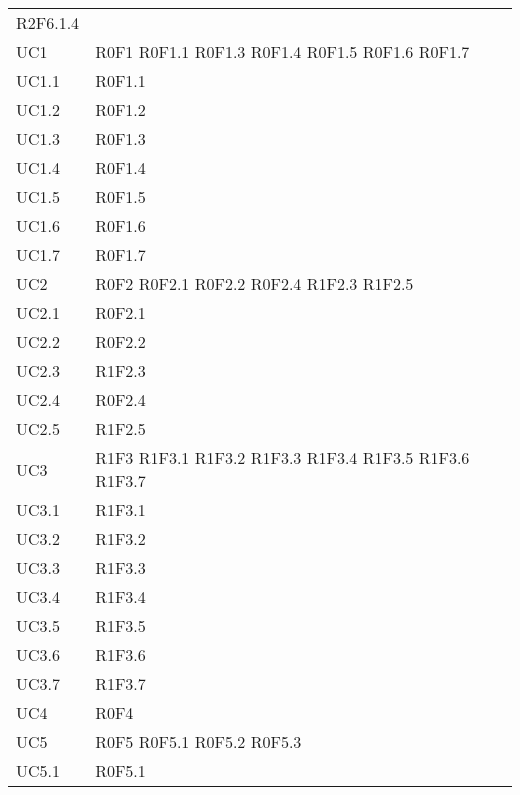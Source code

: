\begin{longtable}{p{2.5cm}!{\VRule[1pt]}p{5.5cm}}
R2F6.1.4 \\
UC1 & R0F1 
	\newline R0F1.1
	\newline R0F1.3
	\newline R0F1.4
	\newline R0F1.5
	\newline R0F1.6
	\newline R0F1.7\\
UC1.1 & R0F1.1\\
UC1.2 & R0F1.2\\
UC1.3 & R0F1.3\\
UC1.4 & R0F1.4\\
UC1.5 & R0F1.5\\
UC1.6 & R0F1.6\\
UC1.7 & R0F1.7\\
UC2 & R0F2
	\newline R0F2.1
	\newline R0F2.2
	\newline R0F2.4
	\newline R1F2.3
	\newline R1F2.5\\
UC2.1 & R0F2.1\\
UC2.2 & R0F2.2\\
UC2.3 & R1F2.3\\
UC2.4 & R0F2.4\\
UC2.5 & R1F2.5\\
UC3 & R1F3
	\newline R1F3.1
	\newline R1F3.2
	\newline R1F3.3
	\newline R1F3.4
	\newline R1F3.5
	\newline R1F3.6
	\newline R1F3.7\\
UC3.1 & R1F3.1\\
UC3.2 & R1F3.2\\
UC3.3 & R1F3.3\\
UC3.4 & R1F3.4\\
UC3.5 & R1F3.5\\
UC3.6 & R1F3.6\\
UC3.7 & R1F3.7\\
UC4 & R0F4\\
UC5 & R0F5
	\newline R0F5.1
	\newline R0F5.2
	\newline R0F5.3\\
UC5.1 & R0F5.1

\end{longtable}

